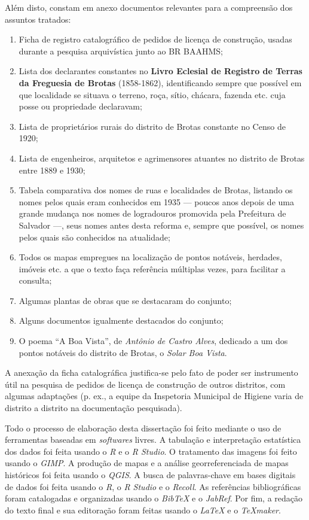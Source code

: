 Além disto, constam em anexo documentos relevantes para a compreensão dos assuntos tratados:

\begin{enumerate}
\item Ficha de registro catalográfico de pedidos de licença de construção, usadas durante a pesquisa arquivística junto ao BR BAAHMS;
\item Lista dos declarantes constantes no \textbf{Livro Eclesial de Registro de Terras da Freguesia de Brotas} (1858-1862), identificando sempre que possível em que localidade se situava o terreno, roça, sítio, chácara, fazenda etc. cuja posse ou propriedade declaravam;
\item Lista de proprietários rurais do distrito de Brotas constante no Censo de 1920;
\item Lista de engenheiros, arquitetos e agrimensores atuantes no distrito de Brotas entre 1889 e 1930;
\item Tabela comparativa dos nomes de ruas e localidades de Brotas, listando os nomes pelos quais eram conhecidos em 1935 --- poucos anos depois de uma grande mudança nos nomes de logradouros promovida pela Prefeitura de Salvador \cite{souza_guia_1935} ---, seus nomes antes desta reforma e, sempre que possível, os nomes pelos quais são conhecidos na atualidade;
\item Todos os mapas empregues na localização de pontos notáveis, herdades, imóveis etc. a que o texto faça referência múltiplas vezes, para facilitar a consulta;
\item Algumas plantas de obras que se destacaram do conjunto;
\item Alguns documentos igualmente destacados do conjunto;
\item O poema ``A Boa Vista'', de \textit{Antônio de Castro Alves}, dedicado a um dos pontos notáveis do distrito de Brotas, o \textit{Solar Boa Vista}.
\end{enumerate}

A anexação da ficha catalográfica justifica-se pelo fato de poder ser instrumento útil na pesquisa de pedidos de licença de construção de outros distritos, com algumas adaptações (p. ex., a equipe da Inspetoria Municipal de Higiene varia de distrito a distrito na documentação pesquisada).

Todo o processo de elaboração desta dissertação foi feito mediante o uso de ferramentas baseadas em \textit{softwares} livres. A tabulação e interpretação estatística dos dados foi feita usando o \textit{R} e o \textit{R Studio}. O tratamento das imagens foi feito usando o \textit{GIMP}. A produção de mapas e a análise georreferenciada de mapas históricos foi feita usando o \textit{QGIS}. A busca de palavras-chave em bases digitais de dados foi feita usando o \textit{R}, o \textit{R Studio} e o \textit{Recoll}. As referências bibliográficas foram catalogadas e organizadas usando o \textit{BibTeX} e o \textit{JabRef}. Por fim, a redação do texto final e sua editoração foram feitas usando o \textit{LaTeX} e o \textit{TeXmaker}. 

